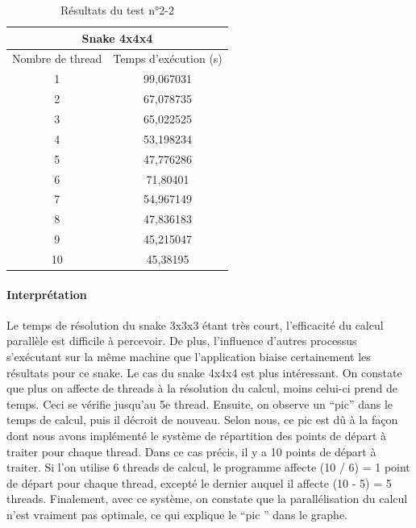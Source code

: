 \begin{table}[h]
\begin{center}
\begin{tabular}{|*{2}{c|}}
\hline
\multicolumn{2}{|c|}{Snake 4x4x4} \\
\hline
Nombre de thread & Temps d’exécution (s) \\
\hline
1 & 99,067031 \\
\hline
2 & 67,078735 \\
\hline
3 & 65,022525 \\
\hline
4 & 53,198234 \\
\hline
5 & 47,776286 \\
\hline
6 & 71,80401 \\
\hline
7 & 54,967149 \\
\hline
8 & 47,836183 \\
\hline
9 & 45,215047 \\
\hline
10 & 45,38195 \\
\hline
\end{tabular}
\end{center}
\caption{Résultats du test n°2-2}
\end{table}

\newpage

\paragraph{Interprétation} Le temps de résolution du snake 3x3x3 étant très court, l'efficacité du calcul parallèle est difficile à percevoir. De plus, l'influence d'autres processus s'exécutant sur la même machine que l'application biaise certainement les résultats pour ce snake. Le cas du snake 4x4x4 est plus intéressant. On constate que plus on affecte de threads à la résolution du calcul, moins celui-ci prend de temps. Ceci se vérifie jusqu'au 5e thread. Ensuite, on observe un ``pic'' dans le temps de calcul, puis il décroit de nouveau. Selon nous, ce pic est dû à la façon dont nous avons implémenté le système de répartition des points de départ à traiter pour chaque thread. Dans ce cas précis, il y a 10 points de départ à traiter. Si l'on utilise 6 threads de calcul, le programme affecte (10 / 6) = 1 point de départ pour chaque thread, excepté le dernier auquel il affecte (10 - 5) = 5 threads. Finalement, avec ce système, on constate que la parallélisation du calcul n'est vraiment pas optimale, ce qui explique le ``pic '' dans le graphe.

